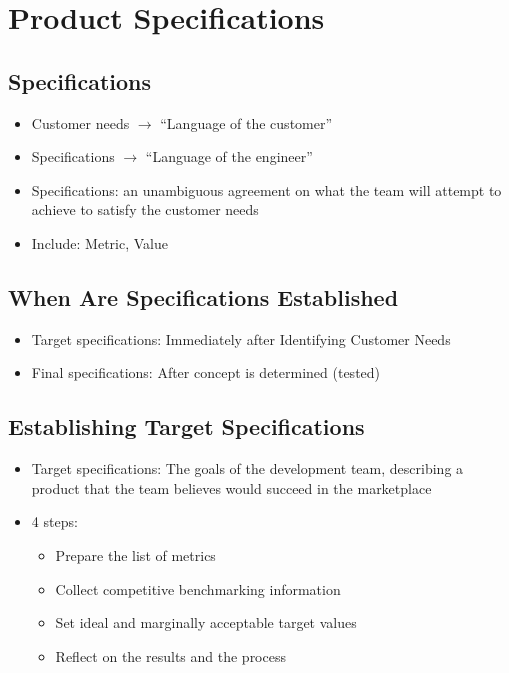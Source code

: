 \documentclass[a4paper,12pt,openany]{book}
\begin{document}
\chapter{Product Specifications}
\section{Specifications}
\begin{itemize}
    \item Customer needs $\to$ ``Language of the customer''
    \item Specifications $\to$ ``Language of the engineer''
    \item Specifications: an unambiguous agreement on what the team will attempt to achieve to satisfy the customer needs
    \item Include: Metric, Value
\end{itemize}
\section{When Are Specifications Established}
\begin{itemize}
    \item Target specifications: Immediately after Identifying Customer Needs
    \item Final specifications: After concept is determined (tested)
\end{itemize}

\section{Establishing Target Specifications}
\begin{itemize}
    \item Target specifications: The goals of the development team, describing a product that the team believes would succeed in the marketplace
    \item 4 steps:
    \begin{itemize}
        \item Prepare the list of metrics
        \item Collect competitive benchmarking information
        \item Set ideal and marginally acceptable target values
        \item Reflect on the results and the process
    \end{itemize}
\end{itemize}
\end{document}
